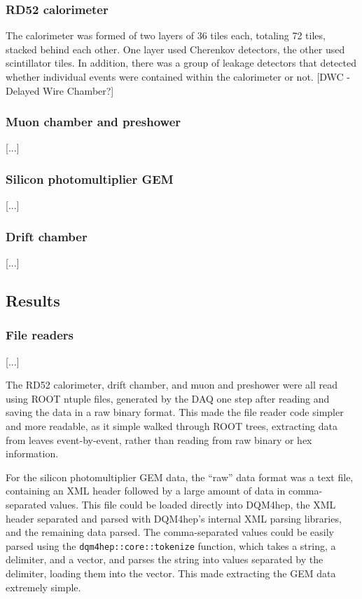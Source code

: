 \subsubsection{RD52 calorimeter}
The calorimeter was formed of two layers of 36 tiles each, totaling 72 tiles, stacked behind each other. One layer used Cherenkov detectors, the other used scintillator tiles. In addition, there was a group of leakage detectors that detected whether individual events were contained within the calorimeter or not. [DWC - Delayed Wire Chamber?]

\subsubsection{Muon chamber and preshower}
[...]

\subsubsection{Silicon photomultiplier GEM}
[...]

\subsubsection{Drift chamber}
[...]

\subsection{Results}

\subsubsection{File readers}
[...]

The RD52 calorimeter, drift chamber, and muon and preshower were all read using ROOT ntuple files, generated by the DAQ one step after reading and saving the data in a raw binary format. This made the file reader code simpler and more readable, as it simple walked through ROOT trees, extracting data from leaves event-by-event, rather than reading from raw binary or hex information.

For the silicon photomultiplier GEM data, the ``raw'' data format was a text file, containing an XML header followed by a large amount of data in comma-separated values. This file could be loaded directly into DQM4hep, the XML header separated and parsed with DQM4hep's internal XML parsing libraries, and the remaining data parsed. The comma-separated values could be easily parsed using the \texttt{dqm4hep::core::tokenize} function, which takes a string, a delimiter, and a vector, and parses the string into values separated by the delimiter, loading them into the vector. This made extracting the GEM data extremely simple.

